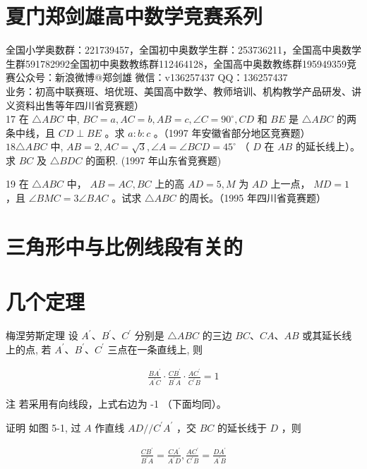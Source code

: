 \documentclass[10pt]{article}
\begin{document}
\section*{夏门郑剑雄高中数学竞赛系列}
全国小学奥数群：221739457，全国初中奥数学生群：253736211，全国高中奥数学生群591782992全国初中奥数教练群112464128，全国高中奥数教练群195949359竞赛公众号：新浪微博@郑剑雄 微信：v136257437 QQ：136257437\\
业务：初高中联赛班、培优班、美国高中数学、教师培训、机构教学产品研发、讲义资料出售等年四川省竞赛题）\\
17 在 $\triangle A B C$ 中, $B C=a, A C=b, A B=c, \angle C=90^{\circ}, C D$ 和 $B E$ 是 $\triangle A B C$ 的两条中线，且 $C D \perp B E$ 。求 $a: b: c$ 。（1997 年安徽省部分地区竞赛题）\\
$18 \triangle A B C$ 中, $A B=2, A C=\sqrt{3}, \angle A=\angle B C D=45^{\circ}$ （ $D$ 在 $A B$ 的延长线上）。求 $B C$ 及 $\triangle B D C$ 的面积. (1997 年山东省竞赛题)

19 在 $\triangle A B C$ 中， $A B=A C, B C$ 上的高 $A D=5, M$ 为 $A D$ 上一点， $M D=1$ ，且 $\angle B M C=3 \angle B A C$ 。试求 $\triangle A B C$ 的周长。（1995 年四川省竟赛题）

\section*{三角形中与比例线段有关的}
\section*{几个定理}
梅涅劳斯定理 设 $A^{\prime} 、 B^{\prime} 、 C^{\prime}$ 分别是 $\triangle A B C$ 的三边 $B C 、 C A 、 A B$ 或其延长线上的点, 若 $A^{\prime} 、 B^{\prime} 、 C^{\prime}$ 三点在一条直线上, 则

\begin{align*}
\frac{B A^{\prime}}{A^{\prime} C} \cdot \frac{C B^{\prime}}{B^{\prime} A} \cdot \frac{A C^{\prime}}{C^{\prime} B}=1 \tag{5-1}
\end{align*}

注 若采用有向线段，上式右边为 -1 （下面均同）。

证明 如图 5-1, 过 $A$ 作直线 $A D / / C^{\prime} A^{\prime}$ ，交 $B C$ 的延长线于 $D$ ，则

\begin{align*}
\frac{C B^{\prime}}{B^{\prime} A}=\frac{C A^{\prime}}{A^{\prime} D}, \frac{A C^{\prime}}{C^{\prime} B}=\frac{D A^{\prime}}{A^{\prime} B}
\end{align*}
\end{document}
